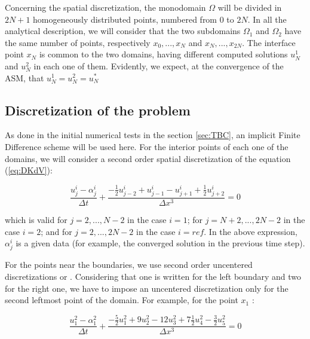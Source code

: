 \indent Concerning the spatial discretization, the monodomain $\Omega$ will be divided in $2N + 1$ homogeneously distributed points, numbered from $0$ to $2N$. In all the analytical description, we will consider that the two subdomains $\Omega_1$ and $\Omega_2$ have the same number of points, respectively $x_0,...,x_N$ and $x_N,...,x_{2N}$. The interface point $x_N$ is common to the two domains, having different computed solutions $u_N^1$ and $u_N^2$ in each one of them. Evidently, we expect, at the convergence of the ASM, that $u_N^1 = u_N^2 = u_N^*$

\subsection{Discretization of the problem}

\indent As done in the initial numerical tests in the section \ref{sec:TBC}, an implicit Finite Difference scheme will be used here. For the interior points of each one of the domains, we will consider a second order spatial discretization of the equation (\ref{eq:DKdV}):

\begin{equation}
    \label{eq:FDdiscretization}
    \frac{u_j^i - \alpha_j^i}{\Delta t} + \frac{-\frac{1}{2}u_{j-2}^i + u_{j-1}^i - u_{j+1}^i + \frac{1}{2}u_{j+2}^i }{\Delta x ^3} = 0
\end{equation}

\noindent which is valid for $j=2,...,N-2$ in the case $i=1$; for $j=N+2,...,2N-2$ in the case $i=2$; and for $j=2,...,2N-2$ in the case $i=ref$. In the above expression, $\alpha_j^i$ is a given data (for example, the converged solution in the previous time step).

\indent For the points near the boundaries, we use second order uncentered discretizations or . Considering that one  is written for the left boundary and two for the right one, we have to impose an uncentered discretization only for the second leftmost point of the domain. For example, for the point $x_1$ : 

\begin{equation*}
    \frac{u_{1}^2 - \alpha_{1}^2}{\Delta t} + \frac{-\frac{5}{2}u_{1}^2 + 9u_{2}^2 - 12 u_{3}^2 + 7\frac{1}{2}u_{4}^2 -\frac{3}{2}u_{5}^2}{\Delta x ^3} = 0
\end{equation*}

